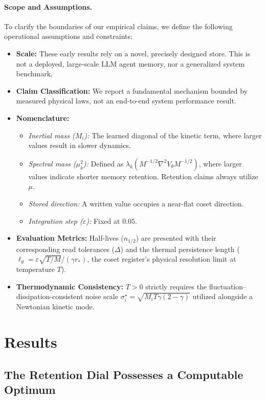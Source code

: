 \documentclass{article}
\begin{document}
\paragraph{Scope and Assumptions.}
To clarify the boundaries of our empirical claims, we define the following operational assumptions and constraints:
\begin{itemize}
    \item \textbf{Scale:} These early results rely on a novel, precisely designed store. This is not a deployed, large-scale LLM agent memory, nor a generalized system benchmark.
    \item \textbf{Claim Classification:} We report a fundamental mechanism bounded by measured physical laws, not an end-to-end system performance result.
    \item \textbf{Nomenclature:}
    \begin{itemize}
        \item \emph{Inertial mass ($M_i$):} The learned diagonal of the kinetic term, where larger values result in slower dynamics.
        \item \emph{Spectral mass ($\mu_k^2$):} Defined as $\lambda_k(M^{-1/2}\nabla^2V_\theta M^{-1/2})$, where larger values indicate shorter memory retention. Retention claims always utilize $\mu$.
        \item \emph{Stored direction:} A written value occupies a near-flat coset direction.
        \item \emph{Integration step ($\varepsilon$):} Fixed at $0.05$.
    \end{itemize}
    \item \textbf{Evaluation Metrics:} Half-lives ($n_{1/2}$) are presented with their corresponding read tolerances ($\Delta$) and the thermal persistence length ($\ell_\theta=\varepsilon\sqrt{T/M}/(\gamma r_*)$, the coset register's physical resolution limit at temperature $T$).
    \item \textbf{Thermodynamic Consistency:} $T>0$ strictly requires the fluctuation--dissipation-consistent noise scale $\sigma^\star_i=\sqrt{M_iT\gamma(2-\gamma)}$ utilized alongside a Newtonian kinetic mode.
\end{itemize}

\section{Results}\label{sec:results}

\subsection{The Retention Dial Possesses a Computable Optimum}\label{sec:vcurve}
\end{document}
